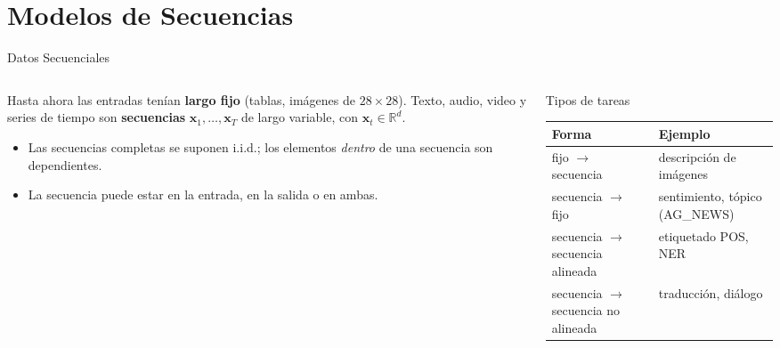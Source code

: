 \documentclass[aspectratio=169, 10pt]{beamer}
\providecommand{\R}{\mathbb{R}}
\begin{document}
\section{Modelos de Secuencias}

\begin{frame}{Datos Secuenciales}

	\begin{columns}[T]
		\begin{column}{0.5\textwidth}
			\small
			Hasta ahora las entradas ten\'ian \textbf{largo fijo} (tablas, im\'agenes de $28\times28$). Texto, audio, video y series de tiempo son \textbf{secuencias} $\mathbf{x}_1, \ldots, \mathbf{x}_T$ de largo variable, con $\mathbf{x}_t \in \R^d$.

			\vspace{0.2cm}

			\begin{itemize}
				\item Las secuencias completas se suponen i.i.d.; los elementos \emph{dentro} de una secuencia son dependientes.
				\item La secuencia puede estar en la entrada, en la salida o en ambas.
			\end{itemize}
		\end{column}

		\begin{column}{0.47\textwidth}
			\begin{block}{Tipos de tareas}
				\scriptsize
				\renewcommand{\arraystretch}{1.15}
				\begin{tabular}{@{}>{\raggedright}p{2.2cm}>{\raggedright\arraybackslash}p{3.3cm}@{}}
					\toprule
					\textbf{Forma} & \textbf{Ejemplo} \\
					\midrule
					fijo $\to$ secuencia & descripci\'on de im\'agenes \\
					secuencia $\to$ fijo & sentimiento, t\'opico (AG\_NEWS) \\
					secuencia $\to$ secuencia alineada & etiquetado POS, NER \\
					secuencia $\to$ secuencia no alineada & traducci\'on, di\'alogo \\
					\bottomrule
				\end{tabular}
			\end{block}
		\end{column}
	\end{columns}

	\vspace{0.3cm}


\end{frame}
\end{document}
